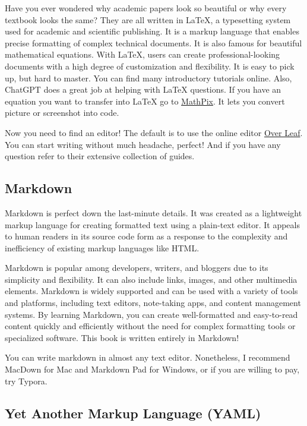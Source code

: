 \documentclass[
  letterpaper,
]{book}
\begin{document}
Have you ever wondered why academic papers look so beautiful or why
every textbook looks the same? They are all written in LaTeX, a
typesetting system used for academic and scientific publishing. It is a
markup language that enables precise formatting of complex technical
documents. It is also famous for beautiful mathematical equations. With
LaTeX, users can create professional-looking documents with a high
degree of customization and flexibility. It is easy to pick up, but hard
to master. You can find many introductory tutorials online. Also,
ChatGPT does a great job at helping with LaTeX questions. If you have an
equation you want to transfer into LaTeX go to
\href{https://mathpix.com/image-to-latex}{MathPix}. It lets you convert
picture or screenshot into code.

Now you need to find an editor! The default is to use the online editor
\href{https://www.overleaf.com/}{Over Leaf}. You can start writing
without much headache, perfect! And if you have any question refer to
their extensive collection of guides.

\hypertarget{markdown}{%
\subsection{Markdown}\label{markdown}}

Markdown is perfect down the last-minute details. It was created as a
lightweight markup language for creating formatted text using a
plain-text editor. It appeals to human readers in its source code form
as a response to the complexity and inefficiency of existing markup
languages like HTML.

Markdown is popular among developers, writers, and bloggers due to its
simplicity and flexibility. It can also include links, images, and other
multimedia elements. Markdown is widely supported and can be used with a
variety of tools and platforms, including text editors, note-taking
apps, and content management systems. By learning Markdown, you can
create well-formatted and easy-to-read content quickly and efficiently
without the need for complex formatting tools or specialized software.
This book is written entirely in Markdown!

You can write markdown in almost any text editor. Nonetheless, I
recommend MacDown for Mac and Markdown Pad for Windows, or if you are
willing to pay, try Typora.

\hypertarget{yet-another-markup-language-yaml}{%
\subsection{Yet Another Markup Language
(YAML)}\label{yet-another-markup-language-yaml}}
\end{document}

